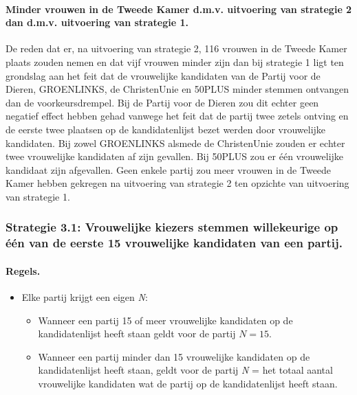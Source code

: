 \paragraph{Minder vrouwen in de Tweede Kamer d.m.v. uitvoering van strategie 2 dan d.m.v. uitvoering van strategie 1.}
De reden dat er, na uitvoering van strategie 2, 116 vrouwen in de Tweede Kamer plaats zouden nemen en dat vijf vrouwen minder zijn dan bij strategie 1 ligt ten grondslag aan het feit dat de vrouwelijke kandidaten van de Partij voor de Dieren, GROENLINKS, de ChristenUnie en 50PLUS minder stemmen ontvangen dan de voorkeursdrempel. Bij de Partij voor de Dieren zou dit echter geen negatief effect hebben gehad vanwege het feit dat de partij twee zetels ontving en de eerste twee plaatsen op de kandidatenlijst bezet werden door vrouwelijke kandidaten. Bij zowel GROENLINKS alsmede de ChristenUnie zouden er echter twee vrouwelijke kandidaten af zijn gevallen. Bij 50PLUS zou er één vrouwelijke kandidaat zijn afgevallen. Geen enkele partij zou meer vrouwen in de Tweede Kamer hebben gekregen na uitvoering van strategie 2 ten opzichte van uitvoering van strategie 1.   


\subsubsection{Strategie 3.1: Vrouwelijke kiezers stemmen willekeurige op één van de eerste 15 vrouwelijke kandidaten van een partij.}

\paragraph{Regels.}
\begin{itemize}
\item
Elke partij krijgt een eigen \textit{N}:
	\begin{itemize}
		\item
Wanneer een partij 15 of meer vrouwelijke kandidaten op de kandidatenlijst heeft staan geldt voor de partij 	$N=15$.
		\item
Wanneer een partij minder dan 15 vrouwelijke kandidaten op de kandidatenlijst heeft staan, geldt voor de partij \textit{N} = het totaal aantal vrouwelijke kandidaten wat de partij op de kandidatenlijst heeft staan.\\
	\end{itemize}
\end{itemize}

